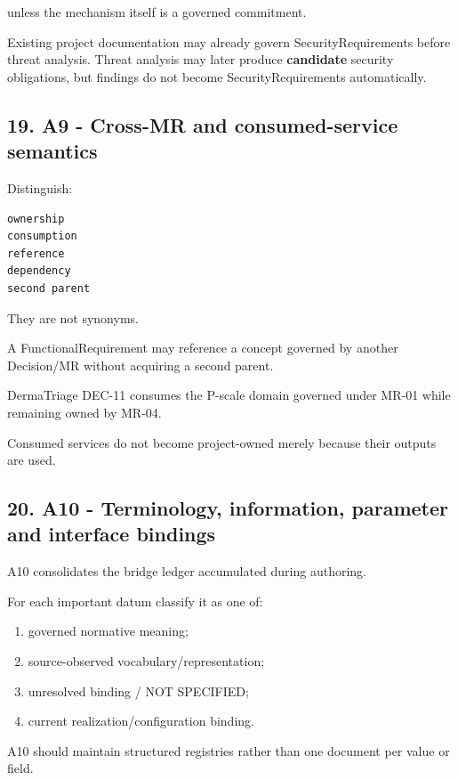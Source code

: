 \documentclass[11pt,a4paper]{article}
\providecommand{\tightlist}{\setlength{\itemsep}{0pt}\setlength{\parskip}{0pt}}
\begin{document}
unless the mechanism itself is a governed commitment.

Existing project documentation may already govern SecurityRequirements
before threat analysis. Threat analysis may later produce
\textbf{candidate} security obligations, but findings do not become
SecurityRequirements automatically.

\subsection{19. A9 - Cross-MR and consumed-service
semantics}\label{19-a9---cross-mr-and-consumed-service-semantics}

Distinguish:

\begin{verbatim}
ownership
consumption
reference
dependency
second parent
\end{verbatim}

They are not synonyms.

A FunctionalRequirement may reference a concept governed by another
Decision/MR without acquiring a second parent.

DermaTriage DEC-11 consumes the P-scale domain governed under MR-01
while remaining owned by MR-04.

Consumed services do not become project-owned merely because their
outputs are used.

\subsection{20. A10 - Terminology, information, parameter and interface
bindings}\label{20-a10---terminology-information-parameter-and-interface-bindings}

A10 consolidates the bridge ledger accumulated during authoring.

For each important datum classify it as one of:

\begin{enumerate}
\def\labelenumi{\arabic{enumi}.}
\tightlist
\item
  governed normative meaning;
\item
  source-observed vocabulary/representation;
\item
  unresolved binding / NOT SPECIFIED;
\item
  current realization/configuration binding.
\end{enumerate}

A10 should maintain structured registries rather than one document per
value or field.
\end{document}
